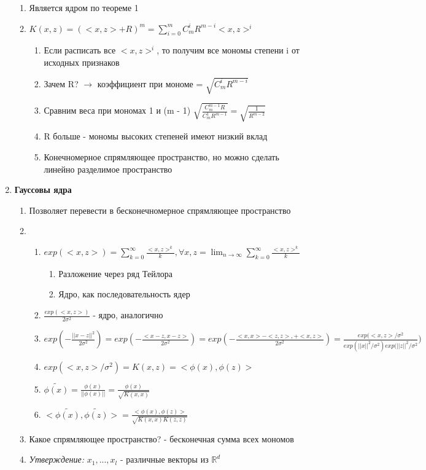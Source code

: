 \documentclass[a4paper, 12pt]{article}
\begin{document}
\begin{enumerate}
\begin{enumerate}
        \item Является ядром по теореме 1
        \item $K(x, z) = (<x, z> + R)^{m} = \sum_{i = 0}^{m} C_{m}^{i}R^{m - i}<x, z>^{i}$
        \begin{enumerate}
            \item Если расписать все $<x, z>^{i}$, то получим все мономы степени i от исходных признаков 
            \item Зачем R? $\rightarrow$ коэффициент при мономе = $\sqrt{C_{m}^{i}R^{m - i}}$
            \item Сравним веса при мономах 1 и (m - 1)
            $\sqrt{\frac{C^{m - 1}_{m}R}{C^{1}_{m}R^{m-1}}} = \sqrt{\frac{1}{R^{m - 2}}}$
            \item R больше - мономы высоких степеней имеют низкий вклад
            \item Конечномерное спрямляющее пространство, но можно сделать линейно разделимое пространство
        \end{enumerate}
    \end{enumerate}
    \item \textbf{Гауссовы ядра}
    \begin{enumerate}
        \item Позволяет перевести в бесконечномерное спрямляющее пространство
        \item {}
        \begin{enumerate}
            \item $exp(<x, z>) = \sum_{k = 0}^{\infty}\frac{<x, z>^{k}}{k\!}, \forall x, z = \lim_{n \to \infty}  \sum_{k = 0}^{\infty}\frac{<x, z>^{k}}{k\!}$
            \begin{enumerate}
                \item Разложение через ряд Тейлора
                \item Ядро, как последовательность ядер
            \end{enumerate}
            \item $\frac{exp(<x, z>)}{2\sigma^{2}}$ - ядро, аналогично
            \item $exp\left(-\frac{||x - z||^{2}}{2\sigma^{2}}\right) = exp\left(-\frac{<x - z, x - z>}{2\sigma^{2}}\right) = exp\left(-\frac{<x,x> -  <z, z>,  + <x, z>}{2\sigma^{2}}\right) = \frac{exp(<x, z> / \sigma^{2}}{exp(||x||^{2} / \sigma^{2})exp(||z||^{2} / \sigma^{2}})$
            \item $exp(<x, z> / \sigma^{2}) = K(x, z) = <\phi(x), \phi(z)>$
            \item $\tilde{\phi(x)} = \frac{\phi(x)}{||\phi(x)||} = \frac{\phi(x)}{\sqrt{K(x, x)}}$
            \item $<\tilde{\phi(x)}, \tilde{\phi(z)}> = \frac{<\phi(x), \phi(z)>}{\sqrt{K(x, x)K(z, z)}}$
        \end{enumerate}
        \item Какое спрямляющее пространство? - бесконечная сумма всех мономов
        \item \textit{Утверждение:} $x_{1}, ..., x_{l}$ - различные векторы из $\mathbb{R}^{d}$
        

\end{enumerate}
\end{enumerate}
\end{document}
